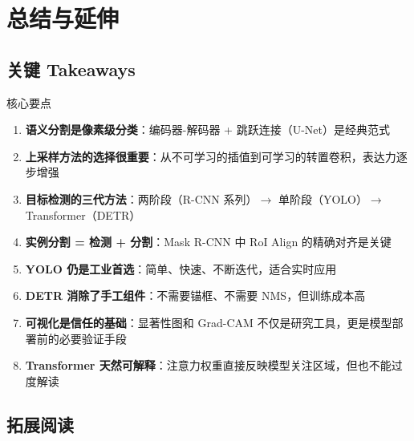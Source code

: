 \section{总结与延伸}

\subsection{关键 Takeaways}

\begin{importantbox}{核心要点}
\begin{enumerate}
    \item \textbf{语义分割是像素级分类}：编码器-解码器 + 跳跃连接（U-Net）是经典范式
    \item \textbf{上采样方法的选择很重要}：从不可学习的插值到可学习的转置卷积，表达力逐步增强
    \item \textbf{目标检测的三代方法}：两阶段（R-CNN 系列）$\rightarrow$ 单阶段（YOLO）$\rightarrow$ Transformer（DETR）
    \item \textbf{实例分割 = 检测 + 分割}：Mask R-CNN 中 RoI Align 的精确对齐是关键
    \item \textbf{YOLO 仍是工业首选}：简单、快速、不断迭代，适合实时应用
    \item \textbf{DETR 消除了手工组件}：不需要锚框、不需要 NMS，但训练成本高
    \item \textbf{可视化是信任的基础}：显著性图和 Grad-CAM 不仅是研究工具，更是模型部署前的必要验证手段
    \item \textbf{Transformer 天然可解释}：注意力权重直接反映模型关注区域，但也不能过度解读
\end{enumerate}
\end{importantbox}

\subsection{拓展阅读}

